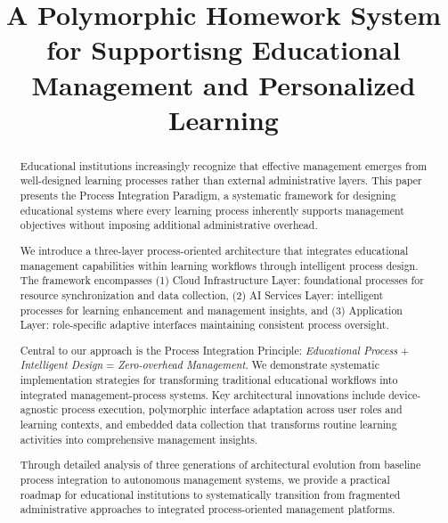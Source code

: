 \documentclass[conference]{IEEEtran}
\begin{document}
\title{\title{A Polymorphic Homework System for Supportisng Educational Management and Personalized Learning}}



\maketitle

\begin{abstract}
Educational institutions increasingly recognize that effective management emerges from well-designed learning processes rather than external administrative layers. This paper presents the Process Integration Paradigm, a systematic framework for designing educational systems where every learning process inherently supports management objectives without imposing additional administrative overhead.

We introduce a three-layer process-oriented architecture that integrates educational management capabilities within learning workflows through intelligent process design. The framework encompasses (1) Cloud Infrastructure Layer: foundational processes for resource synchronization and data collection, (2) AI Services Layer: intelligent processes for learning enhancement and management insights, and (3) Application Layer: role-specific adaptive interfaces maintaining consistent process oversight.

Central to our approach is the Process Integration Principle: \textit{Educational Process} + \textit{Intelligent Design} = \textit{Zero-overhead Management}. We demonstrate systematic implementation strategies for transforming traditional educational workflows into integrated management-process systems. Key architectural innovations include device-agnostic process execution, polymorphic interface adaptation across user roles and learning contexts, and embedded data collection that transforms routine learning activities into comprehensive management insights.

Through detailed analysis of three generations of architectural evolution from baseline process integration to autonomous management systems, we provide a practical roadmap for educational institutions to systematically transition from fragmented administrative approaches to integrated process-oriented management platforms.
\end{abstract}
\end{document}
